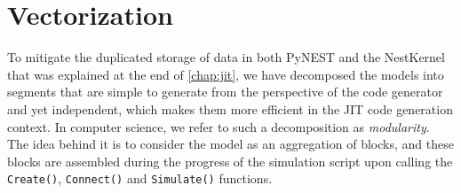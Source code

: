 \chapter{Vectorization}
 \label{chap:vec}
 
 To mitigate the duplicated storage of data in both PyNEST and the NestKernel that was explained at the end of \autoref{chap:jit}, we have decomposed the models into segments that are simple to generate from the perspective of the code generator and yet independent, which makes them more efficient in the JIT code generation context. In computer science, we refer to such a decomposition as \emph{modularity}. The idea behind it is to consider the model as an aggregation of blocks, and these blocks are assembled during the progress of the simulation script upon calling the \texttt{Create()}, \texttt{Connect()} and \texttt{Simulate()} functions.
 
